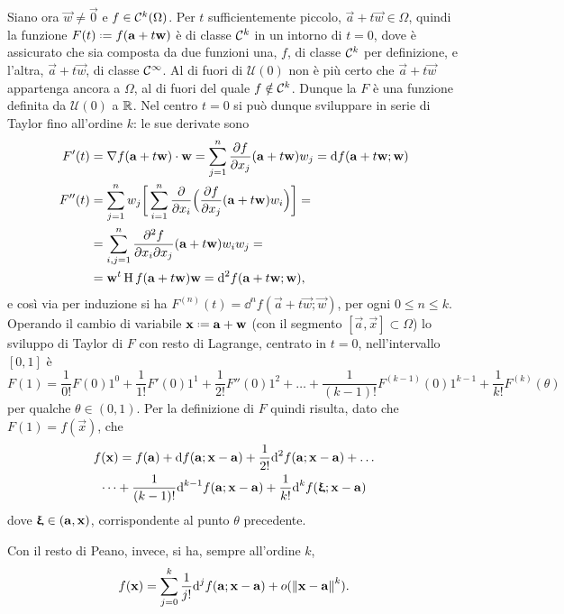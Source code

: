 Siano ora $\vec w\neq\vec 0$ e $f\in\mathcal{C}^{{k}}(\Omega)$. Per $t$ sufficientemente piccolo, $\vec a+t\vec w\in\Omega$, quindi la funzione $F(t)\defeq f(\vec a+t\vec w)$ è di classe $\mathcal{C}^{{k}}$ in un intorno di $t=0$, dove è assicurato che sia composta da due funzioni una, $f$, di classe $\mathcal{C}^{{k}}$ per definizione, e l'altra, $\vec a+t\vec w$, di classe $\mathcal{C}^{{\infty}}$. Al di fuori di $\mathcal U(0)$ non è più certo che $\vec a+t\vec w$ appartenga ancora a $\Omega$, al di fuori del quale $f\notin\mathcal{C}^{{k}}$. Dunque la $F$ è una funzione definita da $\mathcal U(0)$ a $\mathbb{R}$. Nel centro $t=0$ si può dunque sviluppare in serie di Taylor fino all'ordine $k$: le sue derivate sono
\begin{equation}\begin{aligned}
F'(t)	&={\nabla f(\mathbf{a}+t\mathbf{w})}\cdot{\mathbf{w}}=\sum_{j=1}^n\frac{\partial {f}}{\partial {x_j}}(\mathbf{a}+t\mathbf{w})w_j=\textup{d} f(\mathbf{a}+t\mathbf{w};\mathbf{w})\\
F''(t)	&=\sum_{j=1}^nw_j\bigg[\sum_{i=1}^n\frac{\partial {}}{\partial {x_i}}\Big(\frac{\partial {f}}{\partial {x_j}}(\mathbf{a}+t\mathbf{w})w_i\Big)\bigg]=\\
		&=\sum_{i,j=1}^n\frac{\partial^2f}{\partial x_i\partial x_j}(\mathbf{a}+t\mathbf{w})w_iw_j=\\
		&=\mathbf{w}^t\operatorname{H} f(\mathbf{a}+t\mathbf{w})\mathbf{w}=\textup{d}^2f(\mathbf{a}+t\mathbf{w};\mathbf{w}),
\end{aligned}\end{equation}
e così via per induzione %
si ha $F^{(n)}(t)=\dd^nf(\vec a+t\vec w;\vec w)$, per ogni $0\leq n\leq k$.
Operando il cambio di variabile $\vec x\defeq\vec a+\vec w$ (con il segmento $[\vec a,\vec x]\subset\Omega$) lo sviluppo di Taylor di $F$ con resto di Lagrange, centrato in $t=0$, nell'intervallo $[0,1]$ è
\[
F(1)=\frac1{0!}F(0)1^0+\frac1{1!}F'(0)1^1+\frac1{2!}F''(0)1^2+\dots+\frac1{(k-1)!}F^{(k-1)}(0)1^{k-1}+\frac1{k!}F^{(k)}(\theta)
\]
per qualche $\theta\in(0,1)$. Per la definizione di $F$ quindi risulta, dato che $F(1)=f(\vec x)$, che
\begin{multline} \label{eq:formula_taylor_lagrange_piu_variabili}
f(\mathbf{x})=f(\mathbf{a})+\textup{d} f(\mathbf{a};\mathbf{x}-\mathbf{a})+\frac1{2!}\textup{d}^2f(\mathbf{a};\mathbf{x}-\mathbf{a})+\dots\\
\dots+\frac1{(k-1)!}\textup{d}^{k-1}f(\mathbf{a};\mathbf{x}-\mathbf{a})+\frac1{k!}\textup{d}^kf(\bm{\upxi};\mathbf{x}-\mathbf{a})
\end{multline}
dove $\bm{\upxi}\in(\mathbf{a},\mathbf{x})$, corrispondente al punto $\theta$ precedente.

Con il resto di Peano, invece, si ha, sempre all'ordine $k$,
\begin{equation} \label{eq:formula_taylor_peano_piu_variabili}
f(\mathbf{x})=\sum_{j=0}^k\frac1{j!}\textup{d}^jf(\mathbf{a};\mathbf{x}-\mathbf{a})+o(\left\|{\mathbf{x}-\mathbf{a}}\right\|^k).
\end{equation}

